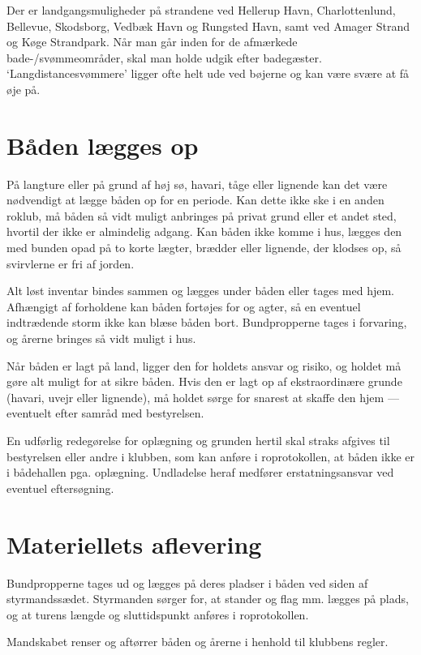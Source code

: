 \documentclass{article}
\begin{document}
Der er landgangsmuligheder på strandene ved Hellerup Havn,
Charlottenlund, Bellevue, Skodsborg, Vedbæk Havn og Rungsted Havn, samt
ved Amager Strand og Køge Strandpark. Når man går inden for de afmærkede
bade-/svømmeområder, skal man holde udgik efter badegæster.
`Langdistancesvømmere' ligger ofte helt ude ved bøjerne og kan være svære
at få øje på.

\section{Båden lægges op}

På langture eller på grund af høj sø, havari, tåge eller lignende kan det
være nødvendigt at lægge båden op for en periode. Kan dette ikke ske i en
anden roklub, må båden så vidt muligt anbringes på privat grund eller et
andet sted, hvortil der ikke er almindelig adgang. Kan båden ikke komme i
hus, lægges den med bunden opad på to korte lægter, brædder eller
lignende, der klodses op, så svirvlerne er fri af jorden.

Alt løst inventar bindes sammen og lægges under båden eller tages med
hjem. Afhængigt af forholdene kan båden fortøjes for og agter, så en
eventuel indtrædende storm ikke kan blæse båden bort. Bundpropperne tages
i forvaring, og årerne bringes så vidt muligt i hus.

Når båden er lagt på land, ligger den for holdets ansvar og risiko, og
holdet må gøre alt muligt for at sikre båden. Hvis den er lagt op af
ekstraordinære grunde (havari, uvejr eller lignende), må holdet sørge for
snarest at skaffe den hjem --- eventuelt efter samråd med bestyrelsen.

En udførlig redegørelse for oplægning og grunden hertil skal straks
afgives til bestyrelsen eller andre i klubben, som kan anføre i
roprotokollen, at båden ikke er i bådehallen pga. oplægning. Undladelse
heraf medfører erstatningsansvar ved eventuel eftersøgning.

\section{Materiellets aflevering}

Bundpropperne tages ud og lægges på deres pladser i båden ved siden af
styrmandssædet. Styrmanden sørger for, at stander og flag mm. lægges på
plads, og at turens længde og sluttidspunkt anføres i roprotokollen.

Mandskabet renser og aftørrer båden og årerne i henhold til klubbens
regler.
\end{document}

